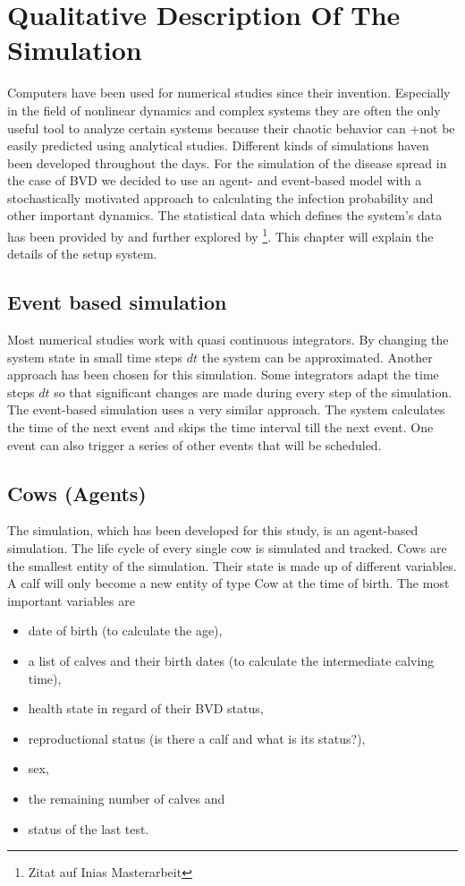 \chapter{Qualitative Description Of The Simulation}
Computers have been used for numerical studies since their invention. Especially in the field of nonlinear dynamics and complex systems they are often the only useful tool to analyze certain systems because their chaotic behavior can +not be easily predicted using analytical studies. Different kinds of simulations haven been developed throughout the days. For the simulation of the disease spread in the case of BVD we decided to use an agent- and event-based model with a stochastically motivated approach to calculating the infection probability and other important dynamics. The statistical data which defines the system's data has been provided by \citep{personalCom} and further explored by \footnote{Zitat auf Inias Masterarbeit}. This chapter will explain the details of the setup system.
\section{Event based simulation}
Most numerical studies work with quasi continuous integrators. By changing the system state in small time steps $dt$ the system can be approximated. Another approach has been chosen for this simulation. Some integrators adapt the time steps $dt$ so that significant changes are made during every step of the simulation. The event-based simulation uses a very similar approach. The system calculates the time of the next event and skips the time interval till the next event. One event can also trigger a series of other events that will be scheduled. 
\section{Cows (Agents)}
The simulation, which has been developed for this study, is an agent-based simulation. The life cycle of every single cow is simulated and tracked. Cows are the smallest entity of the simulation. Their state is made up of different variables. A calf will only become a new entity of type Cow at the time of birth. The most important variables are 
\begin{itemize}
\item date of birth (to calculate the age),
\item a list of calves and their birth dates (to calculate the intermediate calving time),
\item health state in regard of their BVD status,
\item reproductional status (is there a calf and what is its status?),
\item sex,
\item the remaining number of calves and
\item status of the last test.
\end{itemize}

